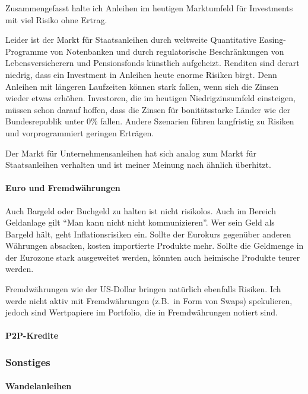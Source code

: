 \documentclass{article}
\begin{document}
Zusammengefasst halte ich Anleihen im heutigen Marktumfeld für Investments mit viel Risiko ohne Ertrag.

Leider ist der Markt für Staatsanleihen durch weltweite Quantitative Easing-Programme von Notenbanken und durch regulatorische Beschränkungen von Lebensversicherern und Pensionsfonds künstlich aufgeheizt. Renditen sind derart niedrig, dass ein Investment in Anleihen heute enorme Risiken birgt. Denn Anleihen mit längeren Laufzeiten können stark fallen, wenn sich die Zinsen wieder etwas erhöhen. Investoren, die im heutigen Niedrigzinsumfeld einsteigen, müssen schon darauf hoffen, dass die Zinsen für bonitätsstarke Länder wie der Bundesrepublik unter 0\% fallen. Andere Szenarien führen langfristig zu Risiken und vorprogrammiert geringen Erträgen.

Der Markt für Unternehmensanleihen hat sich analog zum Markt für Staatsanleihen verhalten und ist meiner Meinung nach ähnlich überhitzt.



\paragraph{Euro und Fremdwährungen}

Auch Bargeld oder Buchgeld zu halten ist nicht risikolos. Auch im Bereich Geldanlage gilt ``Man kann nicht nicht kommunizieren''. Wer sein Geld als Bargeld hält, geht Inflationsrisiken ein. Sollte der Eurokurs gegenüber anderen Währungen absacken, kosten importierte Produkte mehr. Sollte die Geldmenge in der Eurozone stark ausgeweitet werden, könnten auch heimische Produkte teurer werden.

Fremdwährungen wie der US-Dollar bringen natürlich ebenfalls Risiken. Ich werde nicht aktiv mit Fremdwährungen (z.B.\ in Form von Swaps) spekulieren, jedoch sind Wertpapiere im Portfolio, die in Fremdwährungen notiert sind.

\paragraph{P2P-Kredite}



\subsubsection{Sonstiges}

\paragraph{Wandelanleihen} 
\end{document}
